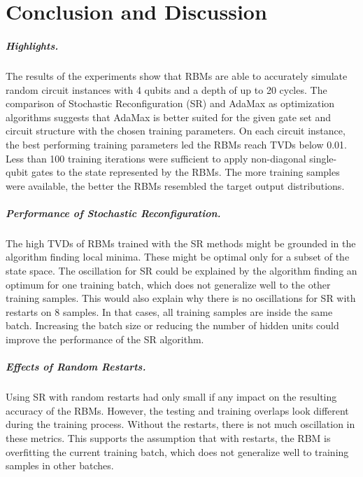 \chapter{Conclusion and Discussion}
\label{sec:discussion}

\paragraph{Highlights.}
The results of the experiments show that RBMs are able to accurately simulate random circuit 
instances with 4 qubits and a depth of up to 20 cycles. The comparison of 
Stochastic Reconfiguration (SR) and AdaMax as optimization algorithms suggests that 
AdaMax is better suited for the given gate set and circuit structure with the chosen training 
parameters. On each circuit instance, the best performing training parameters led 
the RBMs reach TVDs below 0.01. Less than 100 training iterations were sufficient to 
apply non-diagonal single-qubit gates to the state represented by the RBMs. 
The more training samples were available, the better the RBMs resembled the target output distributions.

\paragraph{Performance of Stochastic Reconfiguration.}
The high TVDs of RBMs trained with the SR methods might be grounded in the algorithm finding 
local minima. These might be optimal only for a subset of the state space. The oscillation for SR could be explained by the algorithm finding an 
optimum for one training batch, which does not generalize well to the other training samples.
This would also explain why there is no oscillations for SR with restarts on 8 samples. In that
cases, all training samples are inside the same batch. Increasing the batch size or reducing the 
number of hidden units could improve the performance of the SR algorithm.

\paragraph{Effects of Random Restarts.}
Using SR with random restarts had only small if any 
impact on the resulting accuracy of the RBMs. However, the testing and training overlaps 
look different during the training process. Without the restarts, there is not much 
oscillation in these metrics. This supports the assumption that with restarts, the 
RBM is overfitting the current training batch, which does not generalize well to training 
samples in other batches. 

